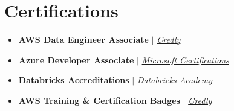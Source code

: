 \documentclass[letterpaper,10pt]{article}
\newcommand{\resumeSubHeadingListStart}{\begin{itemize}[leftmargin=0.15in, topsep=0.5pt,label={}]}
\begin{document}
\section{Certifications}
  \vspace{-15pt}
  \begin{multicols}{2}
\begin{itemize}[itemsep=0pt]

    
         \item{
        \textbf{AWS Data Engineer Associate} $|$ \emph{\href{https://www.credly.com/badges/6b158600-d1cb-469c-b0e9-67bfca39ab66/public_url}{\color{blue}Credly}}}{}\\ 
        \item{ 
        \textbf{Azure Developer Associate } $|$ \emph{\href{https://learn.microsoft.com/api/credentials/share/en-us/PratheekKerthivenkata-7946/99E289371AF8C172?sharingId=F942F4410F0E1341}{\color{blue}Microsoft Certifications}}}{}
        \item{
        \textbf{Databricks Accreditations} $|$ \emph{\href{https://scq.io/2GRJ5ku}{\color{blue}Databricks Academy}}}{}\\ 
        \item{
        \textbf{AWS Training \& Certification Badges} $|$ \emph{\href{https://www.credly.com/users/sai-pratheek-k-v-d-s-n-k}{\color{blue}Credly}}}{} \\ 
        



\end{itemize}
  \end{multicols}

\vspace{-18pt}



       
\end{document}
